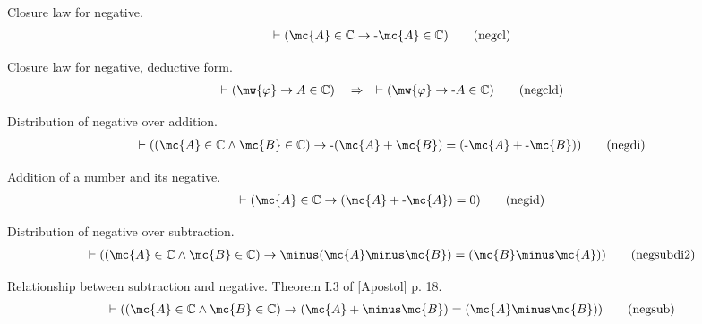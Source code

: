 \begin{lemma} {Closure law for negative.}  
\begin{align}
\vdash ( \mc{A} \in \mathbb{C} \rightarrow \textrm{-} \mc{A} \in \mathbb{C}
    )\label{eq:negcl}\tag{negcl}
\end{align}
\end{lemma}


\begin{lemma} {Closure law for negative, deductive form.}
\begin{align}
\vdash ( \mw{\varphi} \rightarrow A \in \mathbb{C} )\quad\Rightarrow\quad
    \vdash ( \mw{\varphi} \rightarrow \textrm{-} A \in \mathbb{C}
    )\label{eq:negcld}\tag{negcld}
\end{align}
\end{lemma}


\begin{lemma} {Distribution of negative over addition.} 
\begin{align}
\vdash ( ( \mc{A} \in \mathbb{C} \wedge \mc{B} \in \mathbb{C} ) \rightarrow \textrm{-} (
    \mc{A} + \mc{B} ) = ( \textrm{-} \mc{A} + \textrm{-} \mc{B} ) )\label{eq:negdi}\tag{negdi}
\end{align}
\end{lemma}


\begin{lemma} {Addition of a number and its negative.} 
\begin{align}
\vdash ( \mc{A} \in \mathbb{C} \rightarrow ( \mc{A} + \textrm{-} \mc{A} ) = 0
    )\label{eq:negid}\tag{negid}
\end{align}
\end{lemma}


\begin{lemma} {Distribution of negative over
subtraction.}  
\begin{align}
\vdash ( ( \mc{A} \in \mathbb{C} \wedge \mc{B} \in \mathbb{C} ) \rightarrow
    \minus ( \mc{A} \minus \mc{B} ) = ( \mc{B} \minus \mc{A} )
    )\label{eq:negsubdi2}\tag{negsubdi2}
\end{align}
\end{lemma}


\begin{lemma} {Relationship between subtraction and
negative.}  Theorem I.3 of [Apostol]  p. 18.  
\begin{align}
\vdash ( ( \mc{A} \in \mathbb{C} \wedge \mc{B} \in \mathbb{C} ) \rightarrow (
    \mc{A} + \minus\mc{B} ) = ( \mc{A} \minus \mc{B} )
    )\label{eq:negsub}\tag{negsub}
\end{align}
\end{lemma}


